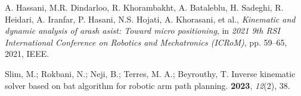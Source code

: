 \begin{thebibliography}{9}
	
	A. Hassani, M.R. Dindarloo, R. Khorambakht, A. Bataleblu, H. Sadeghi, R. Heidari, A. Iranfar, P. Hasani, N.S. Hojati, A. Khorasani, et al.,
	\textit{Kinematic and dynamic analysis of arash asist: Toward micro positioning}, 
	in \textit{2021 9th RSI International Conference on Robotics and Mechatronics (ICRoM)}, 
	pp. 59--65, 2021, IEEE.
	
	Slim, M.; Rokbani, N.; Neji, B.; Terres, M. A.; Beyrouthy, T.
	\newblock Inverse kinematic solver based on bat algorithm for robotic arm path planning.
	 \textbf{2023}, {\em 12}(2), 38.
	
\end{thebibliography}

